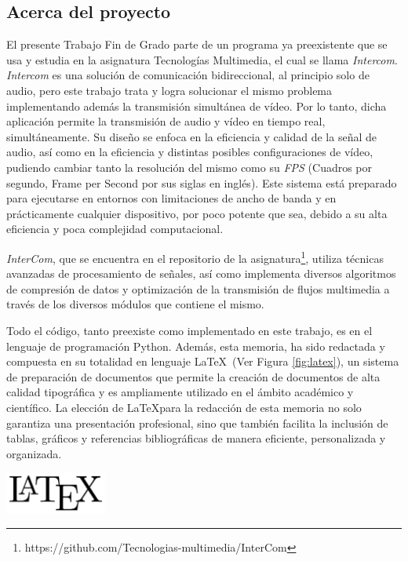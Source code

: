 \label{sec:justificacion_y_objetivos}

\subsection{Acerca del proyecto}

El presente Trabajo Fin de Grado parte de un programa ya preexistente que se usa y estudia en la asignatura Tecnologías Multimedia, el cual se llama \textit{Intercom}. \textit{Intercom} es una solución de comunicación bidireccional, al principio solo de audio, pero este trabajo trata y logra solucionar el mismo problema implementando además la transmisión simultánea de vídeo. Por lo tanto, dicha aplicación permite la transmisión de audio y vídeo en tiempo real, simultáneamente. Su diseño se enfoca en la eficiencia y calidad de la señal de audio, así como en la eficiencia y distintas posibles configuraciones de vídeo, pudiendo cambiar tanto la resolución del mismo como su \textit{FPS} (Cuadros por segundo, Frame per Second por sus siglas en inglés). Este sistema está preparado para ejecutarse en entornos con limitaciones de ancho de banda y en prácticamente cualquier dispositivo, por poco potente que sea, debido a su alta eficiencia y poca complejidad computacional.
\vspace{\baselineskip}

\textit{InterCom}, que se encuentra en el repositorio de la asignatura\footnote{https://github.com/Tecnologias-multimedia/InterCom}, utiliza técnicas avanzadas de procesamiento de señales, así como implementa diversos algoritmos de compresión de datos y optimización de la transmisión de flujos multimedia a través de los diversos módulos que contiene el mismo. 

\vspace{\baselineskip}
Todo el código, tanto preexiste como implementado en este trabajo, es en el lenguaje de programación Python. Además, esta memoria, ha sido redactada y compuesta en su totalidad en lenguaje \LaTeX~(Ver Figura \ref{fig:latex}), un sistema de preparación de documentos que permite la creación de documentos de alta calidad tipográfica y es ampliamente utilizado en el ámbito académico y científico. La elección de \LaTeX para la redacción de esta memoria no solo garantiza una presentación profesional, sino que también facilita la inclusión de tablas, gráficos y referencias bibliográficas de manera eficiente, personalizada y organizada.

\vspace{\baselineskip}
\begin{center}
	\includegraphics[width = 0.25\textwidth]{images/LaTeX_logo.png}
	\label{fig:latex}
\end{center}
\vspace{\baselineskip}

